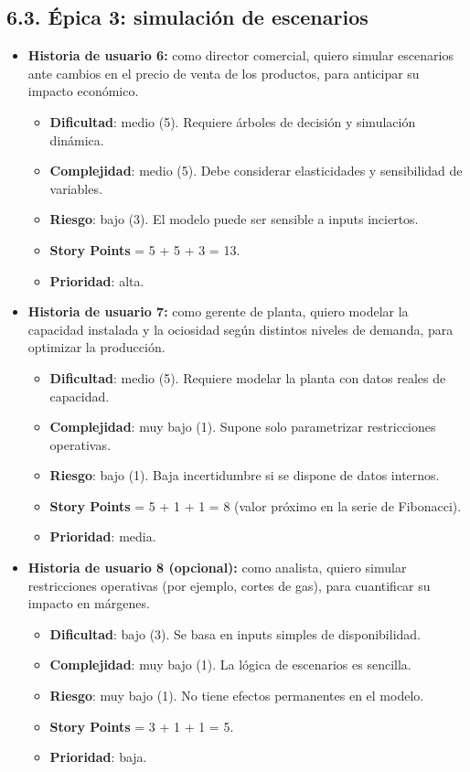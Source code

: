 \documentclass[
11pt, %
]{charter}
\begin{document}
\subsection*{6.3. Épica 3: simulación de escenarios}
\begin{itemize}
  \item \textbf{Historia de usuario 6:} como director comercial, quiero simular escenarios ante cambios en el precio de venta de los productos, para anticipar su impacto económico.
    \begin{itemize}
      \item \textbf{Dificultad}: medio (5). Requiere árboles de decisión y simulación dinámica.
      \item \textbf{Complejidad}: medio (5). Debe considerar elasticidades y sensibilidad de variables.
      \item \textbf{Riesgo}: bajo (3). El modelo puede ser sensible a inputs inciertos.
      \item \textbf{Story Points} = 5 + 5 + 3 = 13.
      \item \textbf{Prioridad}: alta.
    \end{itemize}
  \item \textbf{Historia de usuario 7:} como gerente de planta, quiero modelar la capacidad instalada y la ociosidad según distintos niveles de demanda, para optimizar la producción.
    \begin{itemize}
      \item \textbf{Dificultad}: medio (5). Requiere modelar la planta con datos reales de capacidad.
      \item \textbf{Complejidad}: muy bajo (1). Supone solo parametrizar restricciones operativas.
      \item \textbf{Riesgo}: bajo (1). Baja incertidumbre si se dispone de datos internos.
      \item \textbf{Story Points} = 5 + 1 + 1 = 8 (valor próximo en la serie de Fibonacci).
      \item \textbf{Prioridad}: media.
    \end{itemize}
  \item \textbf{Historia de usuario 8 (opcional):} como analista, quiero simular restricciones operativas (por ejemplo, cortes de gas), para cuantificar su impacto en márgenes.
    \begin{itemize}
      \item \textbf{Dificultad}: bajo (3). Se basa en inputs simples de disponibilidad.
      \item \textbf{Complejidad}: muy bajo (1). La lógica de escenarios es sencilla.
      \item \textbf{Riesgo}: muy bajo (1). No tiene efectos permanentes en el modelo.
      \item \textbf{Story Points} = 3 + 1 + 1 = 5.
      \item \textbf{Prioridad}: baja.
    \end{itemize}
\end{itemize}
\end{document}
